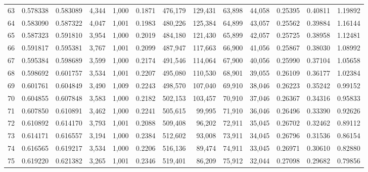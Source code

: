 \begin{tabular}{rrrrrrrrrrrrr}
63  &  0.578338 &  0.583089 &   4,344 &  1,000 &                                     0.1871 &  476,179 &  129,431 &   63,898 &   44,058 &  0.25395 &  0.40811 &  1.19892 \\
64  &  0.583090 &  0.587322 &   4,047 &  1,001 &                                     0.1983 &  480,226 &  125,384 &   64,899 &   43,057 &  0.25562 &  0.39884 &  1.16144 \\
65  &  0.587323 &  0.591810 &   3,954 &  1,000 &                                     0.2019 &  484,180 &  121,430 &   65,899 &   42,057 &  0.25725 &  0.38958 &  1.12481 \\
66  &  0.591817 &  0.595381 &   3,767 &  1,001 &                                     0.2099 &  487,947 &  117,663 &   66,900 &   41,056 &  0.25867 &  0.38030 &  1.08992 \\
67  &  0.595384 &  0.598689 &   3,599 &  1,000 &                                     0.2174 &  491,546 &  114,064 &   67,900 &   40,056 &  0.25990 &  0.37104 &  1.05658 \\
68  &  0.598692 &  0.601757 &   3,534 &  1,001 &                                     0.2207 &  495,080 &  110,530 &   68,901 &   39,055 &  0.26109 &  0.36177 &  1.02384 \\
69  &  0.601761 &  0.604849 &   3,490 &  1,009 &                                     0.2243 &  498,570 &  107,040 &   69,910 &   38,046 &  0.26223 &  0.35242 &  0.99152 \\
70  &  0.604855 &  0.607848 &   3,583 &  1,000 &                                     0.2182 &  502,153 &  103,457 &   70,910 &   37,046 &  0.26367 &  0.34316 &  0.95833 \\
71  &  0.607850 &  0.610891 &   3,462 &  1,000 &                                     0.2241 &  505,615 &   99,995 &   71,910 &   36,046 &  0.26496 &  0.33390 &  0.92626 \\
72  &  0.610892 &  0.614170 &   3,793 &  1,001 &                                     0.2088 &  509,408 &   96,202 &   72,911 &   35,045 &  0.26702 &  0.32462 &  0.89112 \\
73  &  0.614171 &  0.616557 &   3,194 &  1,000 &                                     0.2384 &  512,602 &   93,008 &   73,911 &   34,045 &  0.26796 &  0.31536 &  0.86154 \\
74  &  0.616565 &  0.619217 &   3,534 &  1,000 &                                     0.2206 &  516,136 &   89,474 &   74,911 &   33,045 &  0.26971 &  0.30610 &  0.82880 \\
75  &  0.619220 &  0.621382 &   3,265 &  1,001 &                                     0.2346 &  519,401 &   86,209 &   75,912 &   32,044 &  0.27098 &  0.29682 &  0.79856 \\

\end{tabular}
